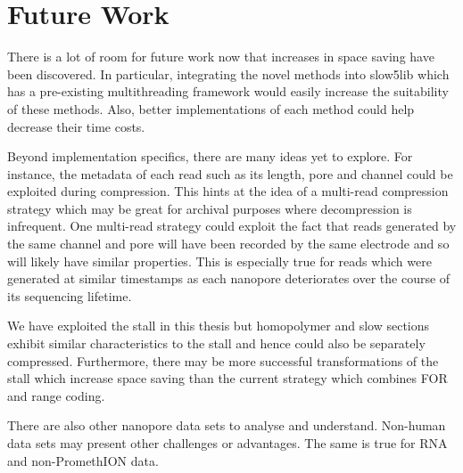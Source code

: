 
\section{Future Work} \label{chap:disc:future}

There is a lot of room for future work now that increases in space saving have
been discovered. In particular, integrating the novel methods into slow5lib
which has a pre-existing multithreading framework would easily increase the
suitability of these methods. Also, better implementations of each method could
help decrease their time costs.

Beyond implementation specifics, there are many ideas yet to explore. For
instance, the metadata of each read such as its length, pore and channel could
be exploited during compression. This hints at the idea of a multi-read
compression strategy which may be great for archival purposes where
decompression is infrequent.
One multi-read strategy could exploit the fact that
reads generated by the same channel and pore will have been
recorded by the same electrode and so will likely have similar properties. This
is especially true for reads which were generated at similar timestamps as each
nanopore deteriorates over the course of its sequencing lifetime.

We have exploited the stall in this thesis but homopolymer and slow sections
exhibit similar characteristics to the stall and hence could also be separately
compressed. Furthermore, there may be more successful transformations of the
stall which increase space saving than the current strategy which combines FOR
and range coding.

There are also other nanopore data sets to analyse and understand. Non-human
data sets may present other challenges or advantages. The same is true for RNA
and non-PromethION data.


